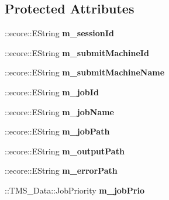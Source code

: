 \subsection*{Protected Attributes}
\begin{DoxyCompactItemize}
\item 
\hypertarget{classTMS__Data_1_1Job_a565b49b314f51a24905d20218c27b901}{
::ecore::EString {\bfseries m\_\-sessionId}}
\label{classTMS__Data_1_1Job_a565b49b314f51a24905d20218c27b901}

\item 
\hypertarget{classTMS__Data_1_1Job_ab73bbb2ea1df19834ce413b8b400e1b0}{
::ecore::EString {\bfseries m\_\-submitMachineId}}
\label{classTMS__Data_1_1Job_ab73bbb2ea1df19834ce413b8b400e1b0}

\item 
\hypertarget{classTMS__Data_1_1Job_a05b24c6174c341b8fd7fe6cc71714579}{
::ecore::EString {\bfseries m\_\-submitMachineName}}
\label{classTMS__Data_1_1Job_a05b24c6174c341b8fd7fe6cc71714579}

\item 
\hypertarget{classTMS__Data_1_1Job_a2cdad1a1a721e7be0a270d2df00c7af6}{
::ecore::EString {\bfseries m\_\-jobId}}
\label{classTMS__Data_1_1Job_a2cdad1a1a721e7be0a270d2df00c7af6}

\item 
\hypertarget{classTMS__Data_1_1Job_a3d892c3893f845c131cf372eef82297f}{
::ecore::EString {\bfseries m\_\-jobName}}
\label{classTMS__Data_1_1Job_a3d892c3893f845c131cf372eef82297f}

\item 
\hypertarget{classTMS__Data_1_1Job_ace31fea9f4cee860feff977b76258c92}{
::ecore::EString {\bfseries m\_\-jobPath}}
\label{classTMS__Data_1_1Job_ace31fea9f4cee860feff977b76258c92}

\item 
\hypertarget{classTMS__Data_1_1Job_ac47cc939f227ceae84bd55bbd49186d3}{
::ecore::EString {\bfseries m\_\-outputPath}}
\label{classTMS__Data_1_1Job_ac47cc939f227ceae84bd55bbd49186d3}

\item 
\hypertarget{classTMS__Data_1_1Job_a79265b2a598b51e8409f22fb38fc0905}{
::ecore::EString {\bfseries m\_\-errorPath}}
\label{classTMS__Data_1_1Job_a79265b2a598b51e8409f22fb38fc0905}

\item 
\hypertarget{classTMS__Data_1_1Job_a2a5884e84c360761304570ae921bd36a}{
::TMS\_\-Data::JobPriority {\bfseries m\_\-jobPrio}}
\label{classTMS__Data_1_1Job_a2a5884e84c360761304570ae921bd36a}


\end{DoxyCompactItemize}
